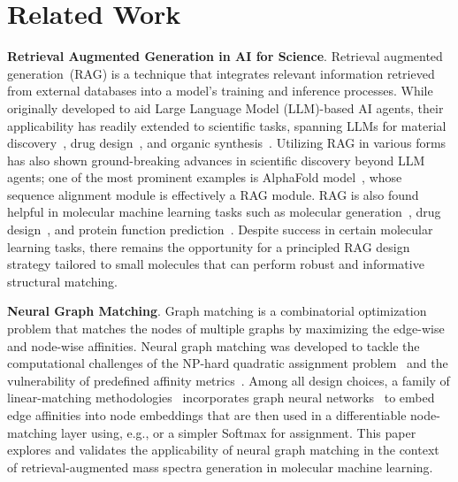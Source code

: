 \section{Related Work}
\textbf{Retrieval Augmented Generation in AI for Science}.
Retrieval augmented generation~(RAG) is a technique that integrates relevant information retrieved from external databases into a model's training and inference processes. While originally developed to aid Large Language Model (LLM)-based AI agents, their applicability has readily extended to scientific tasks, spanning LLMs for material discovery~\citep{buehler2024generative}, drug design~\citep{LLMDrug}, and organic synthesis~\citep{ChemLLM}. Utilizing RAG in various forms  has also shown ground-breaking advances in scientific discovery beyond LLM agents; one of the most prominent examples is AlphaFold model~\citep{jumper2021alphafold}, whose sequence alignment module is effectively a RAG module. 
RAG is also found helpful in molecular machine learning tasks such as molecular generation~\citep{lee2024molecule}, drug design~\citep{zhang2024rag2mol}, and protein function prediction~\citep{shaw2024protex}. Despite success in certain molecular learning tasks, there remains the opportunity for a principled RAG design strategy tailored to small molecules %
that can perform robust and informative structural matching. 


\textbf{Neural Graph Matching}.
Graph matching is a combinatorial optimization problem that matches the nodes of multiple graphs by maximizing the edge-wise and node-wise affinities. Neural graph matching was developed to tackle the computational challenges of the NP-hard quadratic assignment problem~\citep{LawlerMS63} and the vulnerability of predefined affinity metrics~\citep{RolinekECCV20,NowakDSW18,guo2023deep}.
Among all design choices, a family of linear-matching  methodologies~\citep{WangPAMI20,YuICLR20,sarlin2020superglue} incorporates graph neural networks~\citep{scarselli2008graph} to embed edge affinities into node embeddings that are then used in a differentiable node-matching layer using, e.g., \citet{SinkhornAMS64} or a simpler Softmax for assignment. 
This paper explores and validates the applicability of neural graph matching in the context of retrieval-augmented mass spectra generation in molecular machine learning.